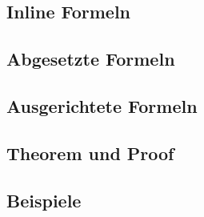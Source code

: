 \documentclass[12pt, a4paper, sectionentrydots=true, listof=totoc, listof=entryprefix, numbers=endperiod]{scrartcl}
\newcounter{SeitenzahlSpeicherRoman}
\begin{document}
\subsection{Inline Formeln}
\begin{spacing}{1.25}

\end{spacing}
%
%
\pagebreak
\subsection{Abgesetzte Formeln}
\begin{spacing}{1.25}

\end{spacing}
%
%
\pagebreak
\subsection{Ausgerichtete Formeln}
\begin{spacing}{1.25}

\end{spacing}%
%
%
\pagebreak
\subsection{Theorem und Proof}
\begin{spacing}{1.25}

\end{spacing}%
%
%
\pagebreak
\subsection{Beispiele}
\begin{spacing}{1.25}

\end{spacing}%
%
%
%
%
%
%
%
%
%
\pagebreak 
\clearpage
{}
\setcounter{page}{\theSeitenzahlSpeicherRoman}
\addtocounter{page}{1}
\ofoot{\thepage{}}
%
%
%
%
%
\clearpage
\end{document}
